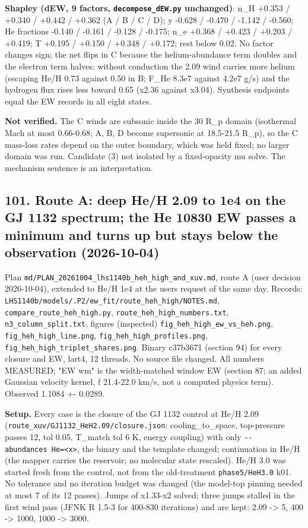 \documentclass[english,a4paper]{my_memo}
\begin{document}
\textbf{Shapley (dEW, 9 factors, \texttt{decompose\_dEW.py} unchanged)}: n\_H +0.353 /
+0.340 / +0.442 / +0.362 (A / B / C / D); y -0.628 / -0.470 / -1.142 /
-0.560; He fractions -0.140 / -0.161 / -0.128 / -0.175; n\_e +0.368 / +0.423
/ +0.203 / +0.419; T +0.195 / +0.150 / +0.348 / +0.172; rest below 0.02.
No factor changes sign; the net flips in C because the helium-abundance
term doubles and the electron term halves: without conduction the 2.09
wind carries more helium (escaping He/H 0.73 against 0.50 in B; F\_He
8.3e7 against 4.2e7 g/s) and the hydrogen flux rises less toward 0.65
(x2.36 against x3.04). Synthesis endpoints equal the EW records in all
eight states.

\textbf{Not verified.} The C winds are subsonic inside the 30 R\_p domain
(isothermal Mach at most 0.66-0.68; A, B, D become supersonic at 18.5-21.5
R\_p), so the C mass-loss rates depend on the outer boundary, which was
held fixed; no larger domain was run. Candidate (3) not isolated by a
fixed-opacity mu solve. The mechanism sentence is an interpretation.

\subsection{101. Route A: deep He/H 2.09 to 1e4 on the GJ 1132 spectrum; the He 10830 EW passes a minimum and turns up but stays below the observation (2026-10-04)}\label{101-route-a-deep-heh-209-to-1e4-on-the-gj-1132-spectrum-the-he-10830-ew-passes-a-minimum-and-turns-up-but-stays-below-the-observation-2026-10-04}

Plan \texttt{md/PLAN\_20261004\_lhs1140b\_heh\_high\_and\_xuv.md}, route A (user decision
2026-10-04), extended to He/H 1e4 at the user\textquotesingle s request of the same day.
Records: \texttt{LHS1140b/models/.P2/ew\_fit/route\_heh\_high/NOTES.md},
\texttt{compare\_route\_heh\_high.py}, \texttt{route\_heh\_high\_numbers.txt},
\texttt{n3\_column\_split.txt}, figures (inspected) \texttt{fig\_heh\_high\_ew\_vs\_heh.png},
\texttt{fig\_heh\_high\_line.png}, \texttt{fig\_heh\_high\_profiles.png},
\texttt{fig\_heh\_high\_triplet\_shares.png}. Binary c37b3671 (section 94) for every
closure and EW, lart4, 12 threads. No source file changed. All numbers
MEASURED; "EW wm" is the width-matched window EW (section 87; an added
Gaussian velocity kernel, f 21.4-22.0 km/s, not a computed physics term).
Observed 1.1084 +- 0.0289.

\textbf{Setup.} Every case is the closure of the GJ 1132 control at He/H 2.09
(\texttt{route\_xuv/GJ1132\_HeH2.09/closure.json}: cooling\_to\_space, top-pressure
passes 12, tol 0.05, T\_match tol 6 K, energy coupling) with only
\texttt{-\/-abundances\ He=\textless{}x\textgreater{}}, the binary and the template changed; continuation in
He/H (the mapper carries the reservoir; no molecular state rescaled). He/H
3.0 was started fresh from the control, not from the old-treatment
\texttt{phase5/HeH3.0} k01. No tolerance and no iteration budget was changed (the
model-top pinning needed at most 7 of its 12 passes). Jumps of x1.33-x2
solved; three jumps stalled in the first wind pass (JFNK \textbar\textbar R\textbar\textbar{} 1.5-3 for
400-830 iterations) and are kept: 2.09 -\textgreater{} 5, 400 -\textgreater{} 1000, 1000 -\textgreater{} 3000.
\end{document}
